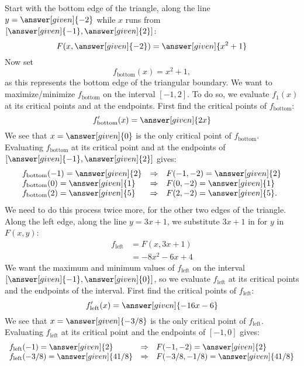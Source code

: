 \documentclass{ximera}
\begin{document}
\begin{example}
\begin{explanation}
    Start with the bottom edge of the triangle, along the line
    $y=\answer[given]{-2}$ while $x$ runs from
    $[\answer[given]{-1},\answer[given]{2}]$:
    \[
    F(x,\answer[given]{-2}) = \answer[given]{x^2+1}
    \]
    Now set
    \[
    f_{\mathrm{bottom}}(x) = x^2+1,
    \]
    as this represents the bottom edge of the triangular boundary. We
    want to maximize/minimize $f_{\mathrm{bottom}}$ on the interval
    $[-1,2]$. To do so, we evaluate $f_1(x)$ at its critical points
    and at the endpoints.  First find the critical points of
    $f_{\mathrm{bottom}}$:
    \[
    f_{\mathrm{bottom}}'(x)= \answer[given]{2x}
    \]
    We see that $x= \answer[given]{0}$ is the only critical point of
    $f_{\mathrm{bottom}}$. Evaluating $f_{\mathrm{bottom}}$ at its
    critical point and at the endpoints of
    $[\answer[given]{-1},\answer[given]{2}]$ gives:
    \[
    \begin{array}{lcl}
      f_{\mathrm{bottom}}(-1) = \answer[given]{2} &\Rightarrow & F(-1,-2) = \answer[given]{2}\\
      f_{\mathrm{bottom}}(0)  = \answer[given]{1} &\Rightarrow & F(0,-2)  = \answer[given]{1}\\
      f_{\mathrm{bottom}}(2)  = \answer[given]{5} &\Rightarrow & F(2,-2)  = \answer[given]{5}.
    \end{array}
    \]
    We need to do this process twice more, for the other two edges of
    the triangle.  Along the left edge, along the line $y=3x+1$, we
    substitute $3x+1$ in for $y$ in $F(x,y)$:
    \begin{align*}
    f_{\mathrm{left}} &= F(x,3x+1)\\
    &= -8x^2-6x+4
    \end{align*}
    We want the maximum and minimum values of $f_{\mathrm{left}}$ on
    the interval $[\answer[given]{-1},\answer[given]{0}]$, so we
    evaluate $f_{\mathrm{left}}$ at its critical points and the
    endpoints of the interval. First find the critical points of
    $f_{\mathrm{left}}$:
    \[
    f'_{\mathrm{left}}(x) = \answer[given]{-16x-6}
    \]
    We see that $x = \answer[given]{-3/8}$ is the only critical point
    of $f_{\mathrm{left}}$.  Evaluating $f_{\mathrm{left}}$ at its
    critical point and the endpoints of $[-1,0]$ gives:
    \[
    \begin{array}{lcl}
      f_{\mathrm{left}}(-1) = \answer[given]{2} &\Rightarrow& F(-1,-2) = \answer[given]{2}\\
      f_{\mathrm{left}}(-3/8) = \answer[given]{41/8}  &\Rightarrow & F(-3/8,-1/8) = \answer[given]{41/8} \\

\end{array}\]
\end{explanation}
\end{example}
\end{document}
